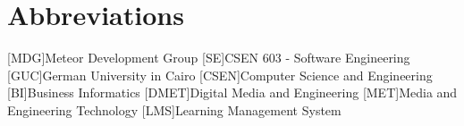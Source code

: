 \appendix
\renewcommand{\appendixtocname}{Appendix}
\renewcommand{\appendixpagename}{\appendixtocname}
\addappheadtotoc
{}
\appendixpage

\chapter{Abbreviations}

\begin{acronym}[\hspace{3cm}]
  [MDG]{Meteor Development Group}
  [SE]{CSEN 603 - Software Engineering}
  [GUC]{German University in Cairo}
  [CSEN]{Computer Science and Engineering}
  [BI]{Business Informatics}
  [DMET]{Digital Media and Engineering}
  [MET]{Media and Engineering Technology \cite{metportal}}
  [LMS]{Learning Management System}
\end{acronym}

\clearpage
\listoffigures
{}
